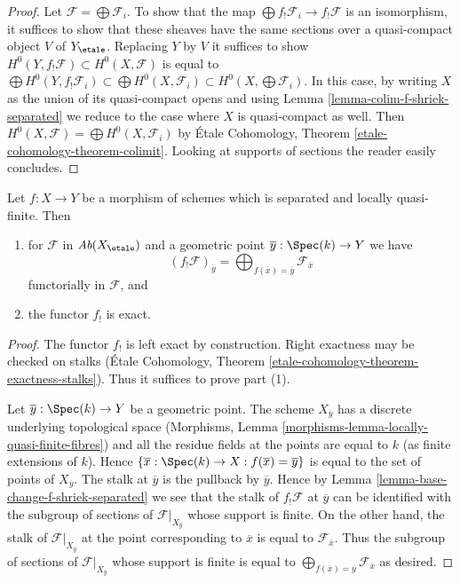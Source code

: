 \begin{proof}
Let $\mathcal{F} = \bigoplus \mathcal{F}_i$. To show that the map
$\bigoplus f_!\mathcal{F}_i \to f_!\mathcal{F}$ is an isomorphism,
it suffices to show that these sheaves have the same sections over
a quasi-compact object $V$ of $Y_\etale$. Replacing $Y$ by $V$
it suffices to show
$H^0(Y, f_!\mathcal{F}) \subset H^0(X, \mathcal{F})$
is equal to
$\bigoplus H^0(Y, f_!\mathcal{F}_i)
\subset \bigoplus H^0(X, \mathcal{F}_i)
\subset H^0(X, \bigoplus \mathcal{F}_i)$.
In this case, by writing $X$ as the union of its quasi-compact opens
and using Lemma \ref{lemma-colim-f-shriek-separated}
we reduce to the case where $X$ is quasi-compact as well.
Then $H^0(X, \mathcal{F}) = \bigoplus H^0(X, \mathcal{F}_i)$
by \'Etale Cohomology, Theorem \ref{etale-cohomology-theorem-colimit}.
Looking at supports of sections the reader easily concludes.
\end{proof}

\begin{lemma}
\label{lemma-lqf-f-shriek-separated-colimits}
Let $f : X \to Y$ be a morphism of schemes which is separated and
locally quasi-finite. Then
\begin{enumerate}
\item for $\mathcal{F}$ in $\textit{Ab}(X_\etale)$ and a geometric
point $\overline{y} : \Spec(k) \to Y$ we have
$$
(f_!\mathcal{F})_{\overline{y}} =
\bigoplus\nolimits_{f(\overline{x}) = \overline{y}} \mathcal{F}_{\overline{x}}
$$
functorially in $\mathcal{F}$, and
\item the functor $f_!$ is exact.
\end{enumerate}
\end{lemma}

\begin{proof}
The functor $f_!$ is left exact by construction. Right exactness may
be checked on stalks
(\'Etale Cohomology, Theorem \ref{etale-cohomology-theorem-exactness-stalks}).
Thus it suffices to prove part (1).

\medskip\noindent
Let $\overline{y} : \Spec(k) \to Y$ be a geometric point.
The scheme $X_{\overline{y}}$ has a discrete underlying
topological space
(Morphisms, Lemma \ref{morphisms-lemma-locally-quasi-finite-fibres})
and all the residue fields at the points are equal to $k$
(as finite extensions of $k$). Hence
$\{\overline{x} : \Spec(k) \to X : f(\overline{x}) = \overline{y}\}$
is equal to the set of points of $X_{\overline{y}}$.
The stalk at $\overline{y}$ is the pullback by $\overline{y}$.
Hence by Lemma \ref{lemma-base-change-f-shriek-separated}
we see that the stalk of $f_!\mathcal{F}$ at $\overline{y}$
can be identified with the subgroup of sections of
$\mathcal{F}|_{X_{\overline{y}}}$ whose support is finite.
On the other hand, the stalk of $\mathcal{F}|_{X_{\overline{y}}}$
at the point corresponding to $\overline{x}$ is equal to
$\mathcal{F}_{\overline{x}}$. Thus the subgroup of sections of
$\mathcal{F}|_{X_{\overline{y}}}$ whose support is finite
is equal to
$\bigoplus_{f(\overline{x}) = \overline{y}} \mathcal{F}_{\overline{x}}$
as desired.
\end{proof}






